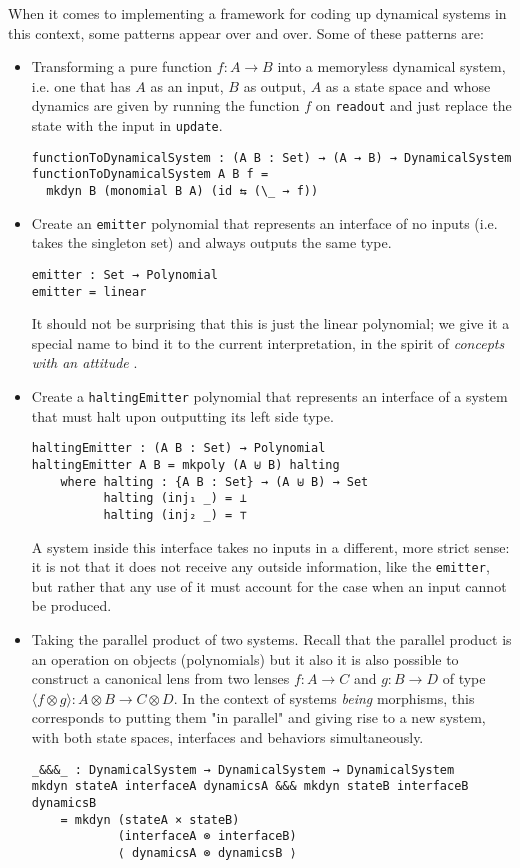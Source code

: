 When it comes to implementing a framework for coding up dynamical systems in this context, some patterns appear over and over. Some of these patterns are: 
\begin{itemize}
    \item Transforming a pure function $f : A \rightarrow B$ into a memoryless dynamical system, i.e. one that has $A$ as an input, $B$ as output, $A$ as a state space and whose dynamics are given by running the function $f$ on \texttt{readout} and just replace the state with the input in \texttt{update}.

        \begin{verbatim}
functionToDynamicalSystem : (A B : Set) → (A → B) → DynamicalSystem
functionToDynamicalSystem A B f = 
  mkdyn B (monomial B A) (id ⇆ (\_ → f))
\end{verbatim}
    \item Create an \texttt{emitter} polynomial that represents an interface of no inputs (i.e. takes the singleton set) and always outputs the same type.
        \begin{verbatim}
emitter : Set → Polynomial
emitter = linear
\end{verbatim}
    It should not be surprising that this is just the linear polynomial; we give it a special name to bind it to the current interpretation, in the spirit of \textit{concepts with an attitude} \cite{conceptwithattitude}.
    \item Create a \texttt{haltingEmitter} polynomial that represents an interface of a system that must halt upon outputting its left side type.
        \begin{verbatim}
haltingEmitter : (A B : Set) → Polynomial
haltingEmitter A B = mkpoly (A ⊎ B) halting
    where halting : {A B : Set} → (A ⊎ B) → Set
          halting (inj₁ _) = ⊥
          halting (inj₂ _) = ⊤
\end{verbatim}
    A system inside this interface takes no inputs in a different, more strict sense: it is not that it does not receive any outside information, like the \texttt{emitter}, but rather that any use of it must account for the case when an input cannot be produced.
    \item Taking the parallel product of two systems. Recall that the parallel product is an operation on objects (polynomials) but it also it is also possible to construct a canonical lens from two lenses $f : A \rightarrow C$ and $g : B \rightarrow D$ of type $\langle f \otimes g \rangle : A \otimes B \rightarrow C \otimes D$. In the context of systems \textit{being} morphisms, this corresponds to putting them "in parallel" and giving rise to a new system, with both state spaces, interfaces and behaviors simultaneously.
    \begin{verbatim}
_&&&_ : DynamicalSystem → DynamicalSystem → DynamicalSystem
mkdyn stateA interfaceA dynamicsA &&& mkdyn stateB interfaceB dynamicsB 
    = mkdyn (stateA × stateB)
            (interfaceA ⊗ interfaceB) 
            ⟨ dynamicsA ⊗ dynamicsB ⟩


\end{verbatim}
\end{itemize}
